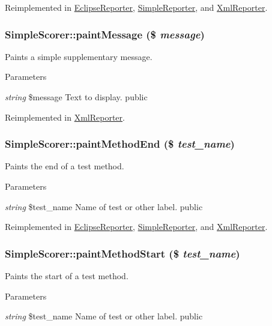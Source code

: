 Reimplemented in \hyperlink{class_eclipse_reporter_a80a6d39b62ad92ee63da0c0b3011c294}{EclipseReporter}, \hyperlink{class_simple_reporter_a3e8ad3ae451da1c3ae1e90c5789f7f2b}{SimpleReporter}, and \hyperlink{class_xml_reporter_a8260073ecaba7369ae53fde9251d1ef5}{XmlReporter}.\hypertarget{class_simple_scorer_a7f36f3898644df27fa84eb506ae706ca}{
\subsubsection[{paintMessage}]{\setlength{\rightskip}{0pt plus 5cm}SimpleScorer::paintMessage (\$ {\em message})}}
\label{class_simple_scorer_a7f36f3898644df27fa84eb506ae706ca}
Paints a simple supplementary message. 
\begin{DoxyParams}{Parameters}
\item[{\em string}]\$message Text to display.  public \end{DoxyParams}


Reimplemented in \hyperlink{class_xml_reporter_af7b86039a6d741e8d5d86d6e85bcc82d}{XmlReporter}.\hypertarget{class_simple_scorer_a419382f8670b1d944f2036bb02dc2800}{
\subsubsection[{paintMethodEnd}]{\setlength{\rightskip}{0pt plus 5cm}SimpleScorer::paintMethodEnd (\$ {\em test\_\-name})}}
\label{class_simple_scorer_a419382f8670b1d944f2036bb02dc2800}
Paints the end of a test method. 
\begin{DoxyParams}{Parameters}
\item[{\em string}]\$test\_\-name Name of test or other label.  public \end{DoxyParams}


Reimplemented in \hyperlink{class_eclipse_reporter_a1322beebd54bfec26b6453b4e7a23d68}{EclipseReporter}, \hyperlink{class_simple_reporter_a0ad8baf509606e35dec1bbefddef3fc0}{SimpleReporter}, and \hyperlink{class_xml_reporter_ae021130f96f98f7ff693740c331c31ae}{XmlReporter}.\hypertarget{class_simple_scorer_a1467957d4a23761b8d23d5d0c88b9a89}{
\subsubsection[{paintMethodStart}]{\setlength{\rightskip}{0pt plus 5cm}SimpleScorer::paintMethodStart (\$ {\em test\_\-name})}}
\label{class_simple_scorer_a1467957d4a23761b8d23d5d0c88b9a89}
Paints the start of a test method. 
\begin{DoxyParams}{Parameters}
\item[{\em string}]\$test\_\-name Name of test or other label.  public \end{DoxyParams}


